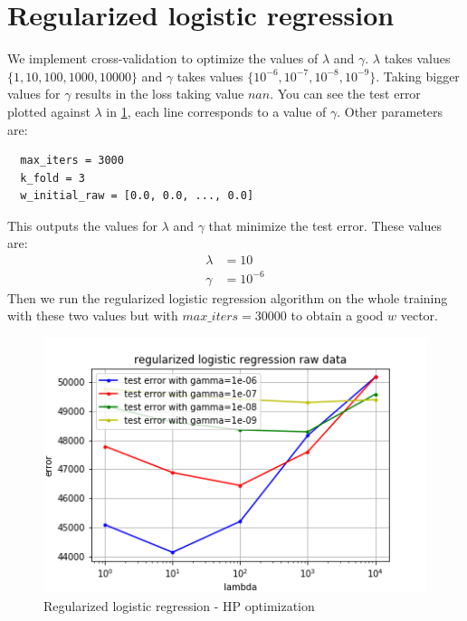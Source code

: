 \documentclass[11pt, a4paper, twoside]{article}
\begin{document}
\section{Regularized logistic regression}
We implement cross-validation to optimize the values of $\lambda$ and $\gamma$. 
$\lambda$ takes values $\{1,10,100,1000,10000\}$ and $\gamma$ takes values $\{10^{-6},10^{-7},10^{-8},10^{-9}\}$. 
Taking bigger values for $\gamma$ results in the loss taking value $nan$. 
You can see the test error plotted against $\lambda$ in \ref{fig:raw_reg_log_regr}, 
each line corresponds to a value of $\gamma$.
Other parameters are:
\begin{lstlisting}
  max_iters = 3000
  k_fold = 3
  w_initial_raw = [0.0, 0.0, ..., 0.0]
\end{lstlisting}
This outputs the values for $\lambda$ and $\gamma$ that minimize the test error. These values are:
\begin{align*}
  \lambda &= 10 \\
  \gamma &= 10^{-6}
\end{align*}
Then we run the regularized logistic regression algorithm on the whole training with these two values but with $max\_iters = 30000$ to obtain a good $w$ vector.


\begin{figure}[h!]
  \includegraphics[width=\linewidth]{plots/raw_data_reg_log_regr.png}
  \caption{Regularized logistic regression - HP optimization}
  \label{fig:raw_reg_log_regr}
\end{figure}
\end{document}
